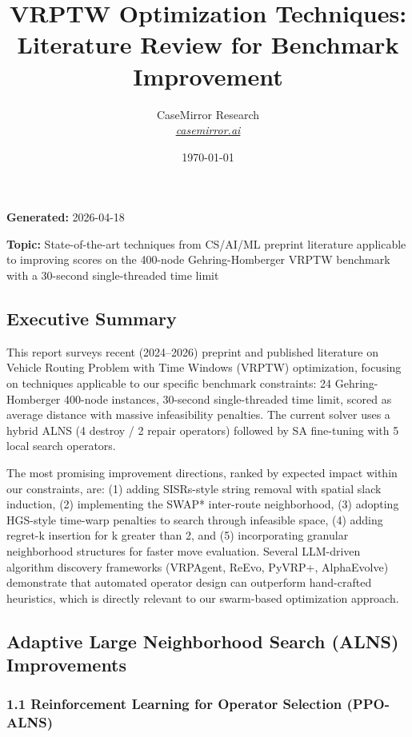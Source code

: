 \documentclass[twocolumn,10pt,letterpaper]{article}
\title{\vspace{-1.8em}\LARGE\bfseries\color{titlebg} VRPTW Optimization Techniques: Literature Review for Benchmark Improvement\vspace{-0.3em}}
\author{CaseMirror Research \\ \small\itshape\href{https://casemirror.ai}{\textcolor{headergray}{casemirror.ai}}}
\date{{\small\color{headergray} \today}}
\begin{document}
\maketitle
\thispagestyle{firstpage}
\vspace{-0.5em}


\textbf{Generated:} 2026-04-18

\textbf{Topic:} State-of-the-art techniques from CS/AI/ML preprint literature applicable to improving scores on the 400-node Gehring-Homberger VRPTW benchmark with a 30-second single-threaded time limit


\subsection{Executive Summary}

This report surveys recent (2024--2026) preprint and published literature on Vehicle Routing Problem with Time Windows (VRPTW) optimization, focusing on techniques applicable to our specific benchmark constraints: 24 Gehring-Homberger 400-node instances, 30-second single-threaded time limit, scored as average distance with massive infeasibility penalties. The current solver uses a hybrid ALNS (4 destroy / 2 repair operators) followed by SA fine-tuning with 5 local search operators.


The most promising improvement directions, ranked by expected impact within our constraints, are: (1) adding SISRs-style string removal with spatial slack induction, (2) implementing the SWAP* inter-route neighborhood, (3) adopting HGS-style time-warp penalties to search through infeasible space, (4) adding regret-k insertion for k greater than 2, and (5) incorporating granular neighborhood structures for faster move evaluation. Several LLM-driven algorithm discovery frameworks (VRPAgent, ReEvo, PyVRP+, AlphaEvolve) demonstrate that automated operator design can outperform hand-crafted heuristics, which is directly relevant to our swarm-based optimization approach.


\subsection{Adaptive Large Neighborhood Search (ALNS) Improvements}

\subsubsection{1.1 Reinforcement Learning for Operator Selection (PPO-ALNS)}
\end{document}
